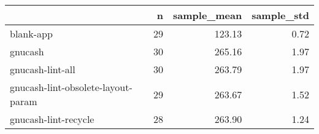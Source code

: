 \begin{tabular}{lrrr}
\toprule
{} &   n &  sample\_mean &  sample\_std \\
\midrule
blank-app                          &  29 &       123.13 &        0.72 \\
gnucash                            &  30 &       265.16 &        1.97 \\
gnucash-lint-all                   &  30 &       263.79 &        1.97 \\
gnucash-lint-obsolete-layout-param &  29 &       263.67 &        1.52 \\
gnucash-lint-recycle               &  28 &       263.90 &        1.24 \\
\bottomrule
\end{tabular}
